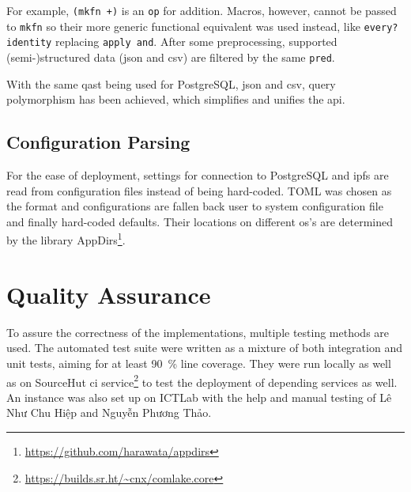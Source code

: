 For example, \verb|(mkfn +)| is an \verb|op| for addition.  Macros, however,
cannot be passed to \verb|mkfn| so their more generic functional equivalent
was used instead, like \verb|every? identity| replacing \verb|apply and|.
After some preprocessing, supported (semi-)structured data (\gls{json}
and \gls{csv}) are filtered by the same \verb|pred|.

With the same \gls{qast} being used for PostgreSQL, \gls{json} and \gls{csv},
query polymorphism has been achieved, which simplifies and unifies
the \gls{api}.

\subsection{Configuration Parsing}
For the ease of deployment, settings for connection to PostgreSQL
and \gls{ipfs} are read from configuration files instead of being hard-coded.
TOML was chosen as the format and configurations are fallen back
user to system configuration file and finally hard-coded defaults.
Their locations on different \gls{os}'s are determined by the library
AppDirs\footnote{\url{https://github.com/harawata/appdirs}}.

\section{Quality Assurance}
To assure the correctness of the implementations, multiple testing methods
are used.  The automated test suite were written as a mixture of
both integration and unit tests, aiming for at least \SI{90}{\percent}
line coverage.  They were run locally as well as on SourceHut \gls{ci}
service\footnote{\url{https://builds.sr.ht/~cnx/comlake.core}}
to test the deployment of depending services as well.  An instance
was also set up on ICTLab with the help and manual testing
of {Lê Như Chu Hiệp and Nguyễn Phương Thảo}.
